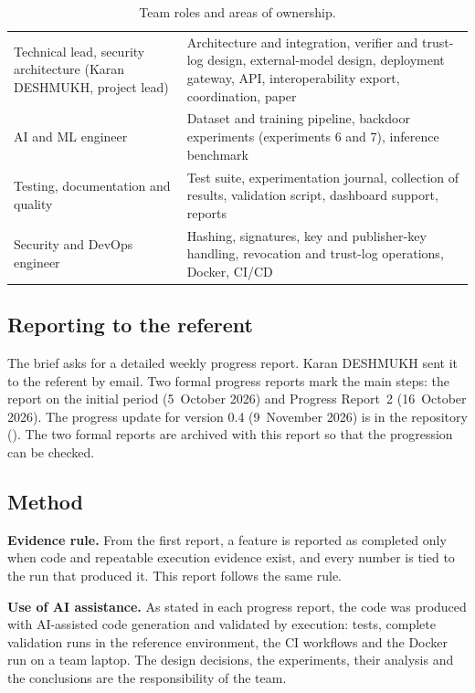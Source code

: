 \begin{table}[H]
\caption{Team roles and areas of ownership.}
\label{tab:team}
\tablefont
\begin{tabularx}{\textwidth}{P{4.6cm}L}
\toprule
\headrow{} &  \\
\midrule
Technical lead, security architecture (Karan DESHMUKH, project lead) & Architecture and integration, verifier and trust-log design, external-model design, deployment gateway, API, interoperability export, coordination, paper \\
AI and ML engineer & Dataset and training pipeline, backdoor experiments (experiments 6 and 7), inference benchmark \\
Testing, documentation and quality & Test suite, experimentation journal, collection of results, validation script, dashboard support, reports \\
Security and DevOps engineer & Hashing, signatures, key and publisher-key handling, revocation and trust-log operations, Docker, CI/CD \\
\bottomrule
\end{tabularx}
\end{table}

\subsection{Reporting to the referent}
The brief asks for a detailed weekly progress report. Karan DESHMUKH sent it to the referent by email. Two
formal progress reports mark the main steps: the report on the initial period (5~October 2026) and Progress
Report~2 (16~October 2026). The progress update for version 0.4 (9~November 2026) is in the repository
(). The two formal reports are archived with this report so that the
progression can be checked.

\subsection{Method}
\textbf{Evidence rule.} From the first report, a feature is reported as completed only when code and
repeatable execution evidence exist, and every number is tied to the run that produced it. This report follows
the same rule.

\textbf{Use of AI assistance.} As stated in each progress report, the code was produced with AI-assisted code
generation and validated by execution: tests, complete validation runs in the reference environment, the CI
workflows and the Docker run on a team laptop. The design decisions, the experiments, their analysis and the
conclusions are the responsibility of the team.


